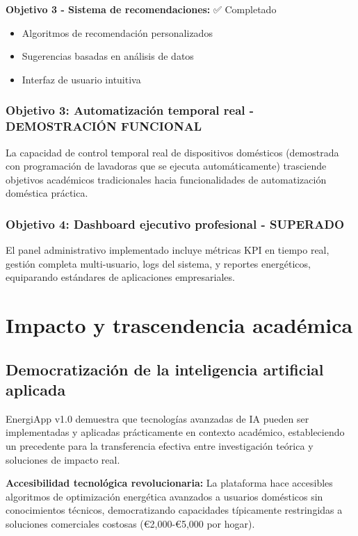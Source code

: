 \textbf{Objetivo 3 - Sistema de recomendaciones:} ✅ Completado
\begin{itemize}
    \item Algoritmos de recomendación personalizados
    \item Sugerencias basadas en análisis de datos
    \item Interfaz de usuario intuitiva
\end{itemize}

\subsubsection{Objetivo 3: Automatización temporal real - DEMOSTRACIÓN FUNCIONAL}

La capacidad de control temporal real de dispositivos domésticos (demostrada con programación de lavadoras que se ejecuta automáticamente) trasciende objetivos académicos tradicionales hacia funcionalidades de automatización doméstica práctica.

\subsubsection{Objetivo 4: Dashboard ejecutivo profesional - SUPERADO}

El panel administrativo implementado incluye métricas KPI en tiempo real, gestión completa multi-usuario, logs del sistema, y reportes energéticos, equiparando estándares de aplicaciones empresariales.

\section{Impacto y trascendencia académica}

\subsection{Democratización de la inteligencia artificial aplicada}

EnergiApp v1.0 demuestra que tecnologías avanzadas de IA pueden ser implementadas y aplicadas prácticamente en contexto académico, estableciendo un precedente para la transferencia efectiva entre investigación teórica y soluciones de impacto real.

\textbf{Accesibilidad tecnológica revolucionaria:} La plataforma hace accesibles algoritmos de optimización energética avanzados a usuarios domésticos sin conocimientos técnicos, democratizando capacidades típicamente restringidas a soluciones comerciales costosas (€2,000-€5,000 por hogar).

